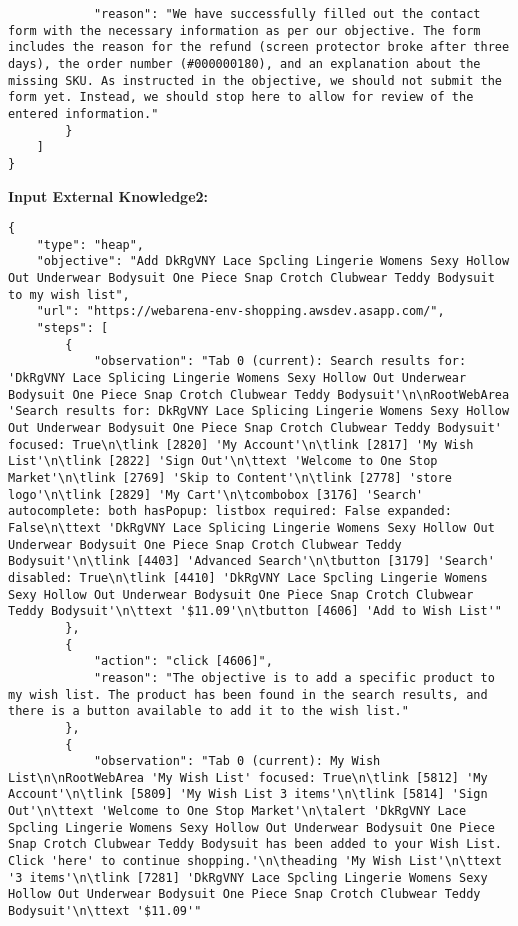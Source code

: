 \begin{tcolorbox}[breakable]
\begin{lstlisting}
            "reason": "We have successfully filled out the contact form with the necessary information as per our objective. The form includes the reason for the refund (screen protector broke after three days), the order number (#000000180), and an explanation about the missing SKU. As instructed in the objective, we should not submit the form yet. Instead, we should stop here to allow for review of the entered information."
        }
    ]
}
\end{lstlisting}




\textbf{Input External Knowledge2:} 
\begin{lstlisting}
{
    "type": "heap",
    "objective": "Add DkRgVNY Lace Spcling Lingerie Womens Sexy Hollow Out Underwear Bodysuit One Piece Snap Crotch Clubwear Teddy Bodysuit to my wish list",
    "url": "https://webarena-env-shopping.awsdev.asapp.com/",
    "steps": [
        {
            "observation": "Tab 0 (current): Search results for: 'DkRgVNY Lace Splicing Lingerie Womens Sexy Hollow Out Underwear Bodysuit One Piece Snap Crotch Clubwear Teddy Bodysuit'\n\nRootWebArea 'Search results for: DkRgVNY Lace Splicing Lingerie Womens Sexy Hollow Out Underwear Bodysuit One Piece Snap Crotch Clubwear Teddy Bodysuit' focused: True\n\tlink [2820] 'My Account'\n\tlink [2817] 'My Wish List'\n\tlink [2822] 'Sign Out'\n\ttext 'Welcome to One Stop Market'\n\tlink [2769] 'Skip to Content'\n\tlink [2778] 'store logo'\n\tlink [2829] 'My Cart'\n\tcombobox [3176] 'Search' autocomplete: both hasPopup: listbox required: False expanded: False\n\ttext 'DkRgVNY Lace Splicing Lingerie Womens Sexy Hollow Out Underwear Bodysuit One Piece Snap Crotch Clubwear Teddy Bodysuit'\n\tlink [4403] 'Advanced Search'\n\tbutton [3179] 'Search' disabled: True\n\tlink [4410] 'DkRgVNY Lace Spcling Lingerie Womens Sexy Hollow Out Underwear Bodysuit One Piece Snap Crotch Clubwear Teddy Bodysuit'\n\ttext '$11.09'\n\tbutton [4606] 'Add to Wish List'"
        },
        {
            "action": "click [4606]",
            "reason": "The objective is to add a specific product to my wish list. The product has been found in the search results, and there is a button available to add it to the wish list."
        },
        {
            "observation": "Tab 0 (current): My Wish List\n\nRootWebArea 'My Wish List' focused: True\n\tlink [5812] 'My Account'\n\tlink [5809] 'My Wish List 3 items'\n\tlink [5814] 'Sign Out'\n\ttext 'Welcome to One Stop Market'\n\talert 'DkRgVNY Lace Spcling Lingerie Womens Sexy Hollow Out Underwear Bodysuit One Piece Snap Crotch Clubwear Teddy Bodysuit has been added to your Wish List. Click 'here' to continue shopping.'\n\theading 'My Wish List'\n\ttext '3 items'\n\tlink [7281] 'DkRgVNY Lace Spcling Lingerie Womens Sexy Hollow Out Underwear Bodysuit One Piece Snap Crotch Clubwear Teddy Bodysuit'\n\ttext '$11.09'"

\end{lstlisting}
\end{tcolorbox}
